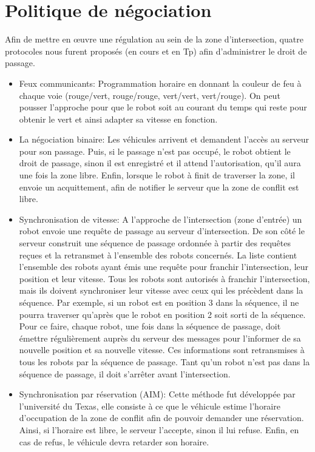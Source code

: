 \documentclass[french,a4paper,12pt]{report}
\begin{document}
\chapter{Politique de négociation}
Afin de mettre en œuvre une régulation au sein de la zone d'intersection, quatre protocoles nous furent proposés (en cours et en Tp) afin d'administrer le droit de passage.

\begin{itemize}
\item Feux communicants:
Programmation horaire en donnant la couleur de feu à chaque voie (rouge/vert, rouge/rouge, vert/vert, vert/rouge).
On peut pousser l'approche pour que le robot soit au courant du temps qui reste pour obtenir le vert et ainsi adapter sa vitesse en fonction.

\item La négociation binaire:
Les véhicules arrivent et demandent l'accès au serveur pour son passage.
Puis, si le passage n'est pas occupé, le robot obtient le droit de passage, sinon il est enregistré et il attend l'autorisation, qu'il aura une fois la zone libre.
Enfin, lorsque le robot à finit de traverser la zone, il envoie un acquittement, afin de notifier le serveur que la zone de conflit est libre.

\item Synchronisation de vitesse:
A l’approche de l'intersection (zone d’entrée) un robot envoie une requête de passage au serveur d’intersection.
De son côté le serveur construit une séquence de passage ordonnée à partir des requêtes reçues et la retransmet
à l’ensemble des robots concernés. La liste contient l’ensemble des robots ayant émis une requête pour franchir
l’intersection, leur position et leur vitesse. Tous les robots sont autorisés à franchir l’intersection, mais ils doivent synchroniser leur vitesse avec ceux qui les précèdent dans la séquence. Par exemple, si un robot est en position 3 dans la séquence, il ne pourra traverser qu’après que le robot en position 2 soit sorti de la séquence. Pour ce faire, chaque robot, une fois dans la séquence de passage, doit émettre régulièrement auprès du serveur des messages pour l’informer de sa nouvelle position et sa nouvelle vitesse. Ces informations sont retransmises à
tous les robots par la séquence de passage. Tant qu’un robot n’est pas dans la séquence de passage, il doit s’arrêter avant l’intersection.

\item Synchronisation par réservation (AIM):
Cette méthode fut développée par l'université du Texas, elle consiste à ce que le véhicule estime l'horaire d'occupation de la zone de conflit afin de pouvoir demander une réservation.
Ainsi, si l'horaire est libre, le serveur l'accepte, sinon il lui refuse.
Enfin, en cas de refus, le véhicule devra retarder son horaire.
\end{itemize}
\end{document}
